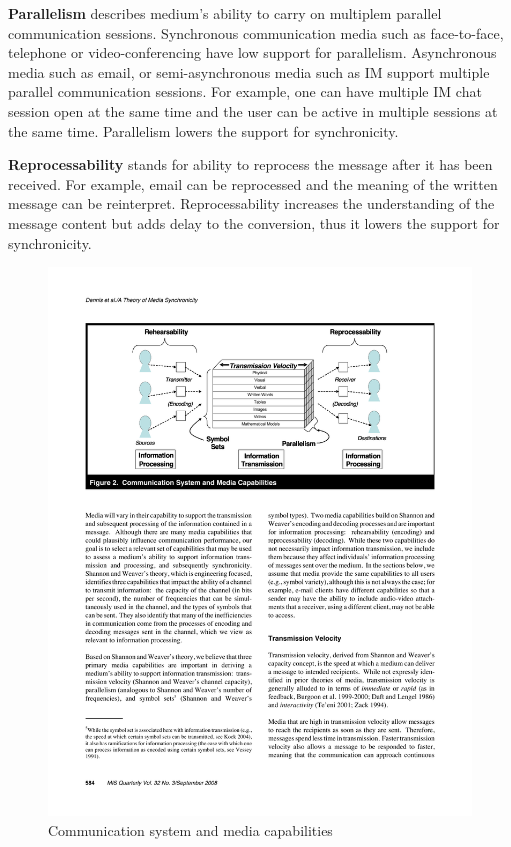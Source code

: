 \documentclass[english,12pt,a4paper,pdftex]{article}
\begin{document}
\textbf{Parallelism} describes medium's ability to carry on multiplem parallel communication sessions. Synchronous communication media such as face-to-face, telephone or video-conferencing have low support for parallelism. Asynchronous media such as email, or semi-asynchronous media such as \ac{IM} support multiple parallel communication sessions. For example, one can have multiple \ac{IM} chat session open at the same time and the user can be active in multiple sessions at the same time. Parallelism lowers the support for synchronicity.

\textbf{Reprocessability} stands for ability to reprocess the message after it has been received. For example, email can be reprocessed and the meaning of the written message can be reinterpret. Reprocessability increases the understanding of the message content but adds delay to the conversion, thus it lowers the support for synchronicity.

\begin{figure}[htb]
\begin{center}
\includegraphics[width=1.0\textwidth]{mst_properties.pdf}
\end{center}
\caption{Communication system and media capabilities \citep{dennis2008}}
\label{fig:mst_properties}
\end{figure}
\end{document}

